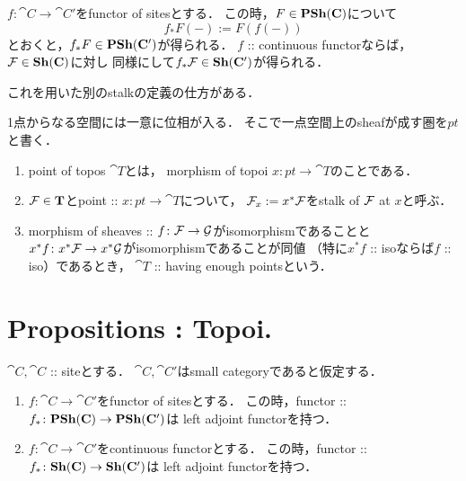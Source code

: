 \documentclass[a4paper]{jsarticle}
\begin{document}
\begin{Def}
    $f \colon \cat{C} \to \cat{C}'$をfunctor of sitesとする．
    この時，$F \in \mathbf{PSh}(\mathbf{C})$について
    \[ f_*F(-):=F(f(-)) \]
    とおくと，$f_* F \in \mathbf{PSh}(\mathbf{C}')$が得られる．
    $f$ :: continuous functorならば，
    $\mathcal{F} \in \mathbf{Sh}(\mathbf{C})$に対し
    同様にして$f_*\mathcal{F} \in \mathbf{Sh}(\mathbf{C}')$が得られる．
\end{Def}

これを用いた別のstalkの定義の仕方がある．
\begin{Def}
    1点からなる空間には一意に位相が入る．
    そこで一点空間上のsheafが成す圏を$pt$と書く．
    \begin{enumerate}[label=(\roman*)]
        \item
            point of topos $\cat{T}$とは，
            morphism of topoi $x \colon pt \to \cat{T}$のことである．
        \item
            $\mathcal{F} \in \mathbf{T}$とpoint :: $x \colon pt \to \cat{T}$について，
            $\mathcal{F}_x := x^*\mathcal{F}$をstalk of $\mathcal{F}$ at $x$と呼ぶ．
        \item
            morphism of sheaves :: $f \colon \mathcal{F} \to \mathcal{G}$がisomorphismであることと
            $x^* f \colon x^* \mathcal{F} \to x^* \mathcal{G}$がisomorphismであることが同値
            （特に$x^*f$ :: isoならば$f$ :: iso）であるとき，
            $\cat{T}$ :: having enough pointsという．
    \end{enumerate}
\end{Def}

\section{Propositions : Topoi.}
\begin{Prop}
    $\cat{C}, \cat{C}$ :: siteとする．
    $\cat{C}, \cat{C}'$はsmall categoryであると仮定する．
    \begin{enumerate}[label=(\roman*)]
    \item
    $f \colon \cat{C} \to \cat{C}'$をfunctor of sitesとする．
    この時，functor :: $f_* \colon \mathbf{PSh}(\mathbf{C}) \to \mathbf{PSh}(\mathbf{C}')$は
    left adjoint functorを持つ．
    
    \item
    $f \colon \cat{C} \to \cat{C}'$をcontinuous functorとする．
    この時，functor :: $f_* \colon \mathbf{Sh}(\mathbf{C}) \to \mathbf{Sh}(\mathbf{C}')$は
    left adjoint functorを持つ．
    \end{enumerate}
\end{Prop}
\end{document}
